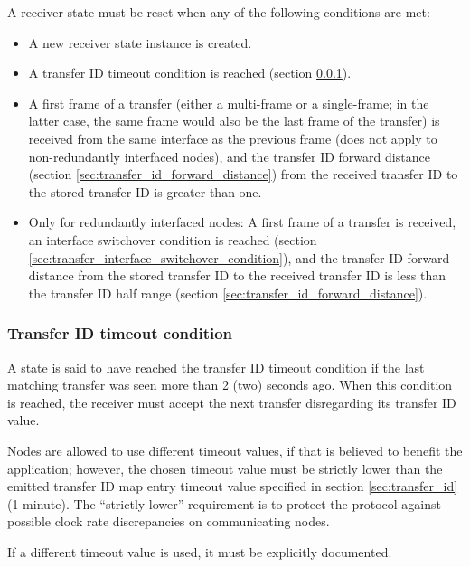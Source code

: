 A receiver state must be reset when any of the following conditions are met:

\begin{itemize}
    \item A new receiver state instance is created.

    \item A transfer ID timeout condition is reached (section \ref{sec:transfer_id_timeout_condition}).

    \item A first frame of a transfer (either a multi-frame or a single-frame; in the latter case, the same frame
    would also be the last frame of the transfer) is received from the same interface as the previous frame
    (does not apply to non-redundantly interfaced nodes),
    and the transfer ID forward distance (section \ref{sec:transfer_id_forward_distance}) from the received
    transfer ID to the stored transfer ID is greater than one.

    \item Only for redundantly interfaced nodes: A first frame of a transfer is received,
    an interface switchover condition is reached (section \ref{sec:transfer_interface_switchover_condition}),
    and the transfer ID forward distance from the stored transfer ID to the received transfer ID is
    less than the transfer ID half range (section \ref{sec:transfer_id_forward_distance}).
\end{itemize}

\subsubsection{Transfer ID timeout condition}\label{sec:transfer_id_timeout_condition}

A state is said to have reached the transfer ID timeout condition
if the last matching transfer was seen more than 2 (two) seconds ago.
When this condition is reached, the receiver must accept the next transfer disregarding its transfer ID value.

Nodes are allowed to use different timeout values, if that is believed to benefit the application;
however, the chosen timeout value must be strictly lower than the emitted transfer ID map entry timeout
value specified in section \ref{sec:transfer_id} (1 minute).
The ``strictly lower'' requirement is to protect the protocol against possible clock rate discrepancies
on communicating nodes.

If a different timeout value is used, it must be explicitly documented.

